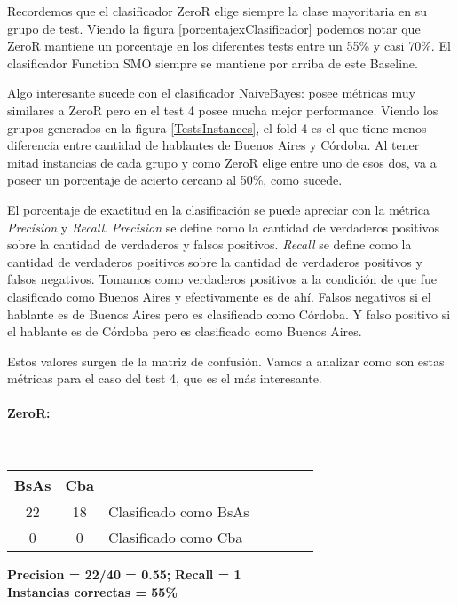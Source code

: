Recordemos que el clasificador ZeroR elige siempre la clase mayoritaria en su grupo de test. Viendo la figura \ref{porcentajexClasificador} podemos notar que ZeroR mantiene un porcentaje en los diferentes tests entre un 55\% y casi 70\%. El clasificador Function SMO siempre se mantiene por arriba de este Baseline.

Algo interesante sucede con el clasificador NaiveBayes: posee métricas muy similares a ZeroR pero en el test 4 posee mucha mejor performance. Viendo los grupos generados en la figura \ref{TestsInstances}, el fold 4 es el que tiene menos diferencia entre cantidad de hablantes de Buenos Aires y Córdoba. Al tener mitad instancias de cada grupo y como ZeroR elige entre uno de esos dos, va a poseer un porcentaje de acierto cercano al 50\%, como sucede.  

El porcentaje de exactitud en la clasificación se puede apreciar con la métrica \textit{Precision} y \textit{Recall}. \textit{Precision} se define como la cantidad de verdaderos positivos sobre la cantidad de verdaderos y falsos positivos. \textit{Recall} se define como la cantidad de verdaderos positivos sobre la cantidad de verdaderos positivos y falsos negativos. Tomamos como verdaderos positivos a la condición de que fue clasificado como Buenos Aires y efectivamente es de ahí. Falsos negativos si el hablante es de Buenos Aires pero es clasificado como Córdoba. Y falso positivo si el hablante es de Córdoba pero es clasificado como Buenos Aires. 


Estos valores surgen de la matriz de confusión. Vamos a analizar como son estas métricas para el caso del test 4, que es el más interesante.


\paragraph*{ZeroR:}\mbox{}\\
\begin{table}[H]
\centering
\begin{tabular}{|c|c|l|c|c|c|c|}
\hline
 BsAs & Cba &  \\ \hline
 22 &  18 &  Clasificado como BsAs \\ \hline
 0  &   0 &  Clasificado como Cba \\ \hline
\end{tabular}
\end{table}
\begin{center}
\textbf{Precision = 22/40 = 0.55;} \textbf{Recall = 1}\\
\textbf{Instancias correctas = 55\%}
\end{center}

